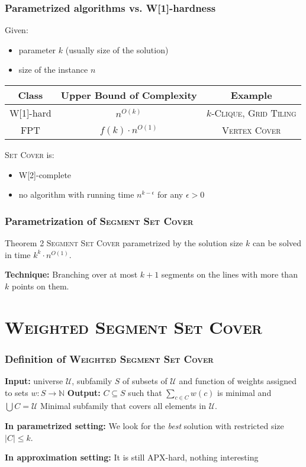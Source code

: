\documentclass{beamer}
\begin{document}
\begin{frame}
\frametitle{Parametrized algorithms vs. W[1]-hardness}
Given:
\begin{itemize}
\item parameter $k$ (usually size of the solution)
\item size of the instance $n$
\end{itemize}
\bigskip

\begin{tabular}{|c|c|c|}
\hline
\textbf{Class} & \textbf{Upper Bound of Complexity} & \textbf{Example}\\
\hline
W[1]-hard & $n^{O(k)}$ & \textsc{$k$-Clique}, \textsc{Grid Tiling}\\
\hline
FPT & $f(k) \cdot n^{O(1)}$ & \textsc{Vertex Cover}\\
\hline
\end{tabular}

\bigskip
\textsc{Set Cover} is:
\begin{itemize}
\item W[2]-complete
\item no algorithm with running time $n^{k-\epsilon}$ for any $\epsilon > 0$
\end{itemize}
\end{frame}

\begin{frame}
\frametitle{Parametrization of \textsc{Segment Set Cover}}
\begin{block}{Theorem 2}
	\textsc{Segment Set Cover} parametrized by the solution size $k$
	can be solved in time $k^k \cdot n^{O(1)}$.
\end{block}

\textbf{Technique:} Branching over at most $k+1$
segments on the lines with more than $k$ points on them.
\end{frame}

\section{\textsc{Weighted Segment Set Cover}} 

\begin{frame}
\frametitle{Definition of \textsc{Weighted Segment Set Cover}}

\textbf{Input:} universe $\mathcal{U}$,
subfamily $S$ of subsets of $\mathcal{U}$
and function of weights assigned to sets $w : S \rightarrow \mathbb{N}$
\newline
\textbf{Output:} $C \subseteq S$ such that $\sum_{c \in C} w(c)$ is minimal and
$\bigcup C = \mathcal{U}$
\newline
Minimal subfamily that covers all elements in $\mathcal{U}$.

\bigskip
\textbf{In parametrized setting:}
We look for the \textit{best} solution with restricted size $|C| \le k$.

\textbf{In approximation setting:}
It is still APX-hard, nothing interesting


\end{frame}
\end{document}
